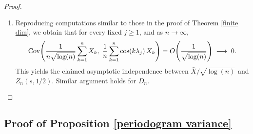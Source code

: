 \documentclass[12pt]{article}
\numberwithin{equation}{section}
\newcommand{\Cov}{{\rm Cov}}
\begin{document}
\begin{proof}
\begin{enumerate}
Therefore,
\[
\mathrm{Var}(D_n)
\sim \frac{\delta(-1/2)}{4}\log(n)
+\frac{3\delta(-1/2)}{4}\log(n)
-2\cdot \frac{\delta(-1/2)}{4}\log(n)
=\frac{\delta(-1/2)}{2}\log(n).
\].
\item Reproducing computations similar to those in the proof of Theorem \ref{finite dim}, we obtain that for every fixed  $j\ge1$, and as $n\to\infty$,
\[
\Cov\!\left(
\frac{1}{n\sqrt{\log(n)}}\sum_{k=1}^n X_k,\;
\frac{1}{n}\sum_{k=1}^n \cos(k\lambda_j)\,X_k
\right)
=
O\!\left(\frac{1}{\sqrt{\log(n)}}\right)
\;\longrightarrow\;0.
\]
This yields the claimed asymptotic independence between $\bar X/\sqrt{\log(n)}$ and $Z_n(s,1/2)$. Similar argument holds for $D_n.$
\end{enumerate}
\end{proof}
\subsection{Proof of Proposition \ref{periodogram variance}}
\end{document}

